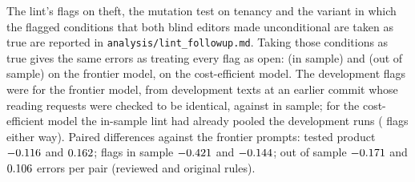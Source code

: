 The lint's flags on theft, the mutation test on tenancy and the variant in which the flagged conditions that both blind editors made unconditional are taken as true are reported in \texttt{analysis/\allowbreak{}lint\_\allowbreak{}followup.md}. Taking those conditions as true gives the same errors as treating every flag as open: \spostHeldTerraFlagCaseTypeErrors{} (in sample) and \spostHeldTerraDevFlagCaseTypeErrors{} (out of sample) on the frontier model, \spostHeldLunaFlagCaseTypeErrors{} on the cost-efficient model. The development flags were \spostDevFlagsTerraN{} for the frontier model, from \spostDevFlagsTerraOffRuns{} development texts at an earlier commit whose reading requests were checked to be identical, against \spostInSampleFlagsTerraN{} in sample; for the cost-efficient model the in-sample lint had already pooled the development runs (\spostDevFlagsLunaN{} flags either way). Paired differences against the frontier prompts: tested product $-0.116$ and $0.162$; flags in sample $-0.421$ and $-0.144$; out of sample $-0.171$ and $0.106$ errors per pair (reviewed and original rules).

